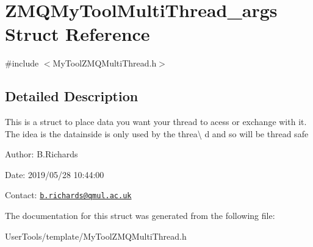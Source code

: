 \hypertarget{structZMQMyToolMultiThread__args}{\section{Z\-M\-Q\-My\-Tool\-Multi\-Thread\-\_\-args Struct Reference}
\label{structZMQMyToolMultiThread__args}
}


{\ttfamily \#include $<$My\-Tool\-Z\-M\-Q\-Multi\-Thread.\-h$>$}



\subsection{Detailed Description}
This is a struct to place data you want your thread to acess or exchange with it. The idea is the datainside is only used by the threa\textbackslash{} d and so will be thread safe

\begin{DoxyParagraph}{Author\-:}
B.\-Richards 
\end{DoxyParagraph}
\begin{DoxyParagraph}{Date\-:}
2019/05/28 10\-:44\-:00 
\end{DoxyParagraph}
Contact\-: \href{mailto:b.richards@qmul.ac.uk}{\tt b.\-richards@qmul.\-ac.\-uk} 

The documentation for this struct was generated from the following file\-:\begin{DoxyCompactItemize}
\item 
User\-Tools/template/My\-Tool\-Z\-M\-Q\-Multi\-Thread.\-h\end{DoxyCompactItemize}
